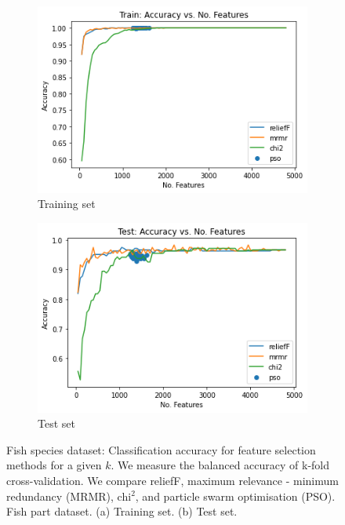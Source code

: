 \documentclass[runningheads]{llncs}
\begin{document}
\begin{figure}[htb]
  \centering
  \begin{subfigure}[b]{\linewidth}
    \includegraphics[width=1\linewidth]{accuracy-features-fish-train.png}
    \caption{Training set}
    \label{fig:accuracy-features-fish-train}
  \end{subfigure}

  \begin{subfigure}[b]{\linewidth}
    \includegraphics[width=1\linewidth]{accuracy-features-fish-test.png}
    \caption{Test set}
    \label{fig:accuracy-features-fish-test}
  \end{subfigure}

  \caption[Two numerical solutions]{
    Fish species dataset: Classification accuracy for feature selection methods for a given $k$.
    We measure the balanced accuracy of k-fold cross-validation.
    We compare reliefF, maximum relevance - minimum redundancy (MRMR), chi$^2$, and particle swarm optimisation (PSO).
    Fish part dataset. (a) Training set. (b) Test set.}
\end{figure}
\end{document}
